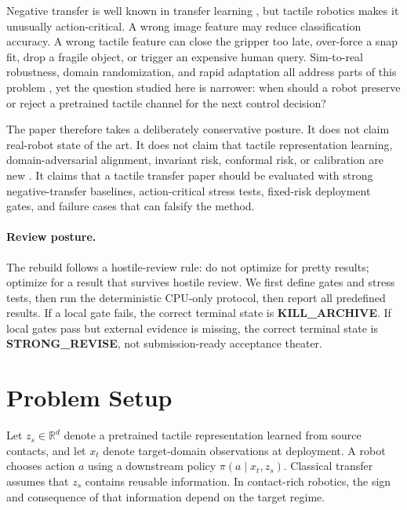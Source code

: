 \documentclass{article}
\begin{document}
Negative transfer is well known in transfer learning \citep{pan2010survey,rosenstein2005negative,weiss2016survey}, but tactile robotics makes it unusually action-critical. A wrong image feature may reduce classification accuracy. A wrong tactile feature can close the gripper too late, over-force a snap fit, drop a fragile object, or trigger an expensive human query. Sim-to-real robustness, domain randomization, and rapid adaptation all address parts of this problem \citep{tobin2017domain,kumar2021rma,hendrycks2021many}, yet the question studied here is narrower: when should a robot preserve or reject a pretrained tactile channel for the next control decision?

The paper therefore takes a deliberately conservative posture. It does not claim real-robot state of the art. It does not claim that tactile representation learning, domain-adversarial alignment, invariant risk, conformal risk, or calibration are new \citep{ganin2016domain,arjovsky2019invariant,vovk2005algorithmic,guo2017calibration}. It claims that a tactile transfer paper should be evaluated with strong negative-transfer baselines, action-critical stress tests, fixed-risk deployment gates, and failure cases that can falsify the method.

\paragraph{Review posture.}
The rebuild follows a hostile-review rule: do not optimize for pretty results; optimize for a result that survives hostile review. We first define gates and stress tests, then run the deterministic CPU-only protocol, then report all predefined results. If a local gate fails, the correct terminal state is \textbf{KILL\_ARCHIVE}. If local gates pass but external evidence is missing, the correct terminal state is \textbf{STRONG\_REVISE}, not submission-ready acceptance theater.

\section{Problem Setup}
Let $z_s \in \mathbb{R}^d$ denote a pretrained tactile representation learned from source contacts, and let $x_t$ denote target-domain observations at deployment. A robot chooses action $a$ using a downstream policy $\pi(a \mid x_t, z_s)$. Classical transfer assumes that $z_s$ contains reusable information. In contact-rich robotics, the sign and consequence of that information depend on the target regime.
\end{document}
